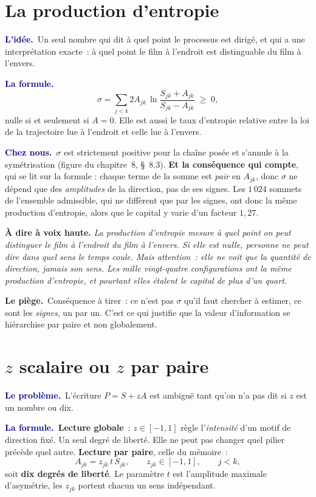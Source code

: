 \documentclass[11pt,a4paper]{article}
\newcommand{\lequoi}[1]{\smallskip\noindent\textcolor{navy}{\textbf{Le problème.}}\ #1\par}
\newcommand{\lidee}[1]{\smallskip\noindent\textcolor{navy}{\textbf{L'idée.}}\ #1\par}
\newcommand{\laformule}[1]{\smallskip\noindent\textcolor{navy}{\textbf{La formule.}}\ #1\par}
\newcommand{\cheznous}[1]{\smallskip\noindent\textcolor{navy}{\textbf{Chez nous.}}\ #1\par}
\newcommand{\lepiege}[1]{\smallskip\noindent\textcolor{accent}{\textbf{Le piège.}}\ #1\par}
\newcommand{\laphrase}[1]{\begin{phrasebox}\textbf{À dire à voix haute.} \emph{#1}\end{phrasebox}}
\begin{document}
\section{La production d'entropie}

\lidee{Un seul nombre qui dit à quel point le processus est dirigé, et qui a une
interprétation exacte~: à quel point le film à l'endroit est distinguable du film à
l'envers.}

\laformule{
\[
  \sigma=\sum_{j<k} 2A_{jk}\,\ln\!\frac{S_{jk}+A_{jk}}{S_{jk}-A_{jk}} \;\ge\; 0,
\]
nulle si et seulement si $A=0$. Elle est aussi le taux d'entropie relative entre la loi de
la trajectoire lue à l'endroit et celle lue à l'envers.}

\cheznous{$\sigma$ est strictement positive pour la chaîne posée et s'annule à la
symétrisation (figure du chapitre~8, \S~8.3). \textbf{Et la conséquence qui compte}, qui se lit
sur la formule : chaque terme de la somme est \emph{pair} en $A_{jk}$, donc $\sigma$ ne dépend que
des \emph{amplitudes} de la direction, pas de ses signes. Les $1\,024$ sommets de l'ensemble
admissible, qui ne diffèrent que par les signes, ont donc la même production d'entropie, alors
que le capital y varie d'un facteur $1{,}27$.}

\laphrase{La production d'entropie mesure à quel point on peut distinguer le film à l'endroit du
film à l'envers. Si elle est nulle, personne ne peut dire dans quel sens le temps coule. Mais
attention~: elle ne voit que la \emph{quantité} de direction, jamais son \emph{sens}. Les mille
vingt-quatre configurations ont la même production d'entropie, et pourtant elles étalent le
capital de plus d'un quart.}

\lepiege{Conséquence à tirer~: ce n'est pas $\sigma$ qu'il faut chercher à estimer, ce sont
les \emph{signes}, un par un. C'est ce qui justifie que la valeur d'information se
hiérarchise par paire et non globalement.}

\section{$z$ scalaire ou $z$ par paire}

\lequoi{L'écriture $P=S+zA$ est ambiguë tant qu'on n'a pas dit si $z$ est un nombre ou dix.}

\laformule{\textbf{Lecture globale}~: $z\in[-1,1]$ règle l'\emph{intensité} d'un motif de
direction fixé. Un seul degré de liberté. Elle ne peut pas changer quel pilier précède
quel autre.
\textbf{Lecture par paire}, celle du mémoire~:
\[
  A_{jk}=z_{jk}\,t\,S_{jk}, \qquad z_{jk}\in[-1,1], \qquad j<k,
\]
soit \textbf{dix degrés de liberté}. Le paramètre $t$ est l'amplitude maximale d'asymétrie,
les $z_{jk}$ portent chacun un sens indépendant.}
\end{document}
